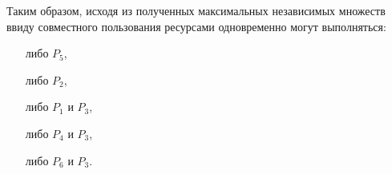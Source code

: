 \documentclass{article}
\begin{document}
\begin{enumerate}
Таким образом, исходя из полученных максимальных независимых множеств ввиду совместного пользования ресурсами одновременно могут выполняться:
\begin{enumerate}
    \item[либо] $P_5$, 
    \item[либо] $P_2$,
    \item[либо] $P_1$ и $P_3$,
    \item[либо] $P_4$ и $P_3$,
    \item[либо] $P_6$ и $P_3$.
\end{enumerate}
\end{enumerate}
\end{document}
